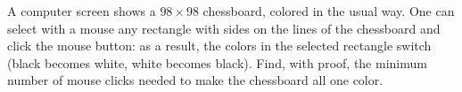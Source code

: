 A computer screen shows a $98 \times 98$ chessboard, colored in the usual way. One can select with a mouse any rectangle with sides on the lines of the chessboard and click the mouse button: as a result,  the colors in the selected rectangle switch (black becomes white, white becomes black). Find, with proof, the minimum number of mouse clicks needed to make the chessboard all one color.